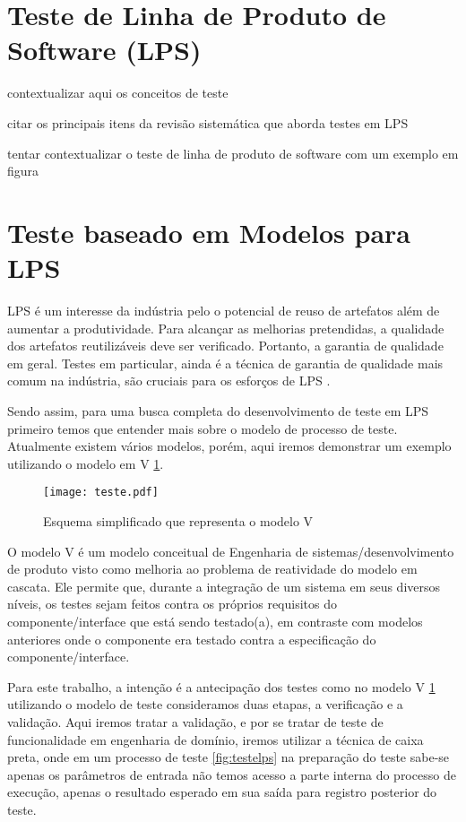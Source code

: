 \section{Teste de Linha de Produto de Software (LPS)}

contextualizar aqui os conceitos de teste

citar os principais itens da revisão sistemática que aborda testes em LPS

tentar contextualizar o teste de linha de produto de software com um exemplo em figura

\section{Teste baseado em Modelos para LPS}

LPS é um interesse da indústria pelo o potencial de reuso de artefatos além de aumentar a produtividade. Para alcançar as melhorias pretendidas, a qualidade dos artefatos reutilizáveis deve ser verificado. Portanto, a garantia de qualidade em geral. Testes em particular, ainda é a técnica de garantia de qualidade mais comum na indústria, são cruciais para os esforços de LPS \cite{delamaro2017introduccao}.

Sendo assim, para uma busca completa do desenvolvimento de teste em LPS primeiro temos que entender mais sobre o modelo de processo de teste. Atualmente existem vários modelos, porém, aqui iremos demonstrar um exemplo utilizando o modelo em V \ref{fig:testeV}.

\begin{figure}[htb]
	\centering
	\texttt{[image: teste.pdf]}
	\caption{ Esquema simplificado que representa o modelo V }
	\label{fig:testeV}
\end{figure}

O modelo V é um modelo conceitual de Engenharia de sistemas/desenvolvimento de produto visto como melhoria ao problema de reatividade do modelo em cascata. Ele permite que, durante a integração de um sistema em seus diversos níveis, os testes sejam feitos contra os próprios requisitos do componente/interface que está sendo testado(a), em contraste com modelos anteriores onde o componente era testado contra a especificação do componente/interface.

Para este trabalho, a intenção é a antecipação dos testes como no modelo V \ref{fig:testeV} utilizando o modelo de teste consideramos duas etapas, a verificação e a validação. Aqui iremos tratar a validação, e por se tratar de teste de funcionalidade em engenharia de domínio, iremos utilizar a técnica de caixa preta,  onde em um processo de teste \ref{fig:testelps} na preparação do teste sabe-se apenas os parâmetros de entrada não temos acesso a parte interna do processo de execução, apenas o resultado esperado em sua saída para registro posterior do teste.


